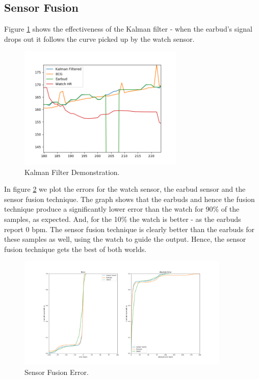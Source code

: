 \documentclass[12pt,a4paper,twoside,openany]{report}
\begin{document}
\subsection{Sensor Fusion}

Figure \ref{fig:kalman-working} shows the effectiveness of the Kalman filter -
when the earbud's signal drops out it follows the curve picked up by the
watch sensor.

\begin{figure}[H]
	\centerline{\includegraphics[width=0.7\textwidth]{figs/kalman-working.png}}
	\caption{Kalman Filter Demonstration.}
	\label{fig:kalman-working}
\end{figure}

In figure \ref{fig:kalman_error} we plot the errors for the watch sensor, the
earbud sensor and the sensor fusion technique. The graph shows that the
earbuds and hence the fusion technique produce a significantly lower error than the watch for 90\% of the
samples, as expected. And, for the 10\% the watch is better - as the earbuds
report 0 bpm. The sensor fusion technique is clearly better than the earbuds
for these samples as well, using the watch to guide the output. Hence, the
sensor fusion technique gets the best of both worlds.

\begin{figure}[H]
	\centerline{\includegraphics[width=0.9\textwidth]{figs/kalman_validity.png}}
	\caption{Sensor Fusion Error.}
	\label{fig:kalman_error}
\end{figure}
\end{document}
